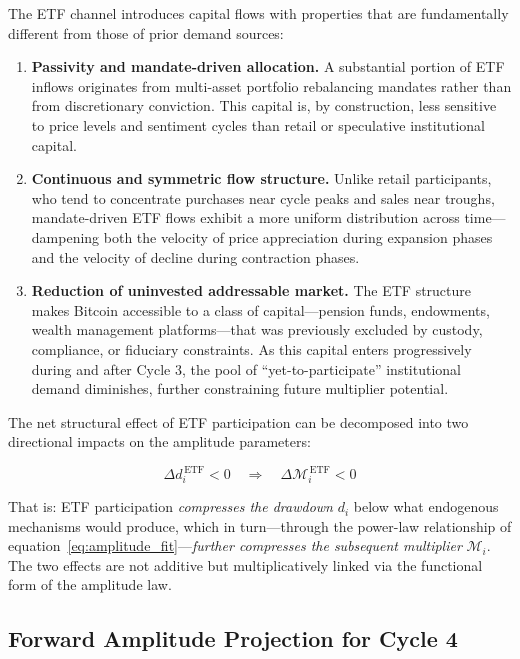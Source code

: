 The ETF channel introduces capital flows with properties that are
fundamentally different from those of prior demand sources:

\begin{enumerate}
  \item \textbf{Passivity and mandate-driven allocation.} A substantial portion
  of ETF inflows originates from multi-asset portfolio rebalancing mandates
  rather than from discretionary conviction. This capital is, by construction,
  less sensitive to price levels and sentiment cycles than retail or
  speculative institutional capital.

  \item \textbf{Continuous and symmetric flow structure.} Unlike retail
  participants, who tend to concentrate purchases near cycle peaks and sales
  near troughs, mandate-driven ETF flows exhibit a more uniform distribution
  across time---dampening both the velocity of price appreciation during
  expansion phases and the velocity of decline during contraction phases.

  \item \textbf{Reduction of uninvested addressable market.} The ETF structure
  makes Bitcoin accessible to a class of capital---pension funds, endowments,
  wealth management platforms---that was previously excluded by custody,
  compliance, or fiduciary constraints. As this capital enters progressively
  during and after Cycle 3, the pool of ``yet-to-participate'' institutional
  demand diminishes, further constraining future multiplier potential.
\end{enumerate}

The net structural effect of ETF participation can be decomposed into two
directional impacts on the amplitude parameters:

\begin{equation}
  \Delta d_i^{\,\text{ETF}} < 0 \quad \Longrightarrow \quad
  \Delta \mathcal{M}_i^{\,\text{ETF}} < 0
  \label{eq:etf_effect}
\end{equation}

That is: ETF participation \textit{compresses the drawdown} $d_i$ below what
endogenous mechanisms would produce, which in turn---through the power-law
relationship of equation~\eqref{eq:amplitude_fit}---\textit{further compresses
the subsequent multiplier} $\mathcal{M}_i$. The two effects are not additive
but multiplicatively linked via the functional form of the amplitude law.

\subsection{Forward Amplitude Projection for Cycle 4}

